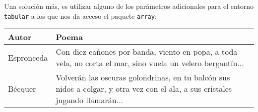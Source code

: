 \documentclass[10pt,letterpaper]{article}
\begin{document}
\vspace{1cm}

Una solución más, es utilizar alguno de los parámetros adicionales para el entorno \texttt{tabular} a los que nos da acceso el paquete \texttt{array}: \\
\begin{tabular}{l|m{5cm}}
	\hline
	Autor & Poema \\
	\hline
	Espronceda & Con diez cañones por banda, viento en popa, a toda vela, no corta el mar, sino vuela un velero bergantín... \\
	\hline
	Bécquer & Volverán las oscuras golondrinas, en tu balcón sus nidos a colgar, y otra vez con el ala, a sus cristales jugando llamarán... \\
	\hline
\end{tabular}
\end{document}

